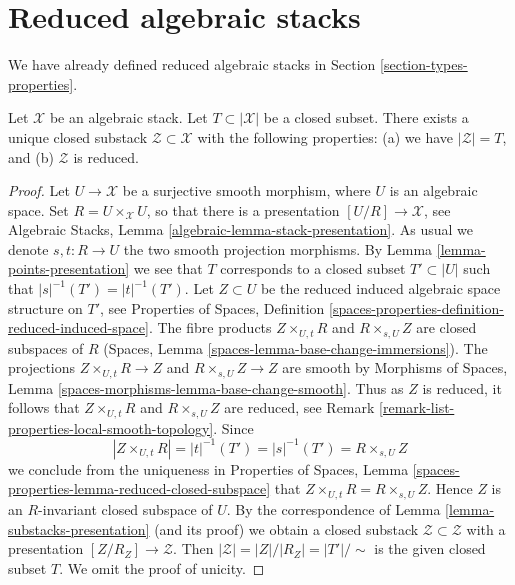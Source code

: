 \section{Reduced algebraic stacks}
\label{section-reduced}

\noindent
We have already defined reduced algebraic stacks in
Section \ref{section-types-properties}.

\begin{lemma}
\label{lemma-reduced-closed-substack}
Let $\mathcal{X}$ be an algebraic stack.
Let $T \subset |\mathcal{X}|$ be a closed subset.
There exists a unique closed substack $\mathcal{Z} \subset \mathcal{X}$
with the following properties:
(a) we have $|\mathcal{Z}| = T$, and (b) $\mathcal{Z}$ is reduced.
\end{lemma}

\begin{proof}
Let $U \to \mathcal{X}$ be a surjective smooth morphism, where $U$ is an
algebraic space. Set $R = U \times_\mathcal{X} U$, so that there is a
presentation $[U/R] \to \mathcal{X}$, see
Algebraic Stacks, Lemma \ref{algebraic-lemma-stack-presentation}.
As usual we denote $s, t : R \to U$ the two smooth projection morphisms.
By Lemma \ref{lemma-points-presentation}
we see that $T$ corresponds to a closed subset $T' \subset |U|$ such
that $|s|^{-1}(T') = |t|^{-1}(T')$.
Let $Z \subset U$ be the reduced induced algebraic space
structure on $T'$, see
Properties of Spaces,
Definition \ref{spaces-properties-definition-reduced-induced-space}.
The fibre products
$Z \times_{U, t} R$ and $R \times_{s, U} Z$ are closed subspaces
of $R$
(Spaces, Lemma \ref{spaces-lemma-base-change-immersions}).
The projections $Z \times_{U, t} R \to Z$ and
$R \times_{s, U} Z \to Z$ are smooth by
Morphisms of Spaces, Lemma \ref{spaces-morphisms-lemma-base-change-smooth}.
Thus as $Z$ is reduced, it follows that
$Z \times_{U, t} R$ and $R \times_{s, U} Z$ are reduced, see
Remark \ref{remark-list-properties-local-smooth-topology}.
Since
$$
|Z \times_{U, t} R| = |t|^{-1}(T') = |s|^{-1}(T') = R \times_{s, U} Z
$$
we conclude from the uniqueness in
Properties of Spaces,
Lemma \ref{spaces-properties-lemma-reduced-closed-subspace}
that $Z \times_{U, t} R = R \times_{s, U} Z$.
Hence $Z$ is an $R$-invariant closed subspace of $U$.
By the correspondence of
Lemma \ref{lemma-substacks-presentation}
(and its proof)
we obtain a closed substack $\mathcal{Z} \subset \mathcal{Z}$
with a presentation $[Z/R_Z] \to \mathcal{Z}$.
Then $|\mathcal{Z}| = |Z|/|R_Z| = |T'|/\sim$ is the given
closed subset $T$. We omit the proof of unicity.
\end{proof}

